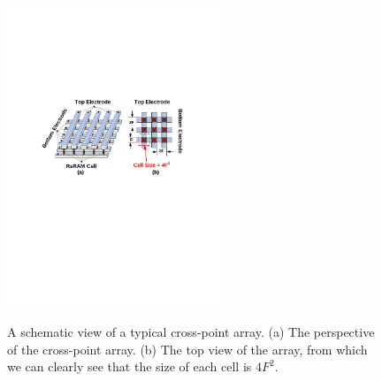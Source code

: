 \begin{figure}
\centering
  \includegraphics[width=2.5in]{./figures/crossbar_array2.pdf}\\\vspace{-10pt}
  \caption{A schematic view of a typical cross-point array. (a) The perspective of the cross-point array.
  (b) The top view of the array, from which we can clearly see that the size of each cell is $4F^2$. }\label{fig:array}
\vspace{-12pt}
\end{figure}

